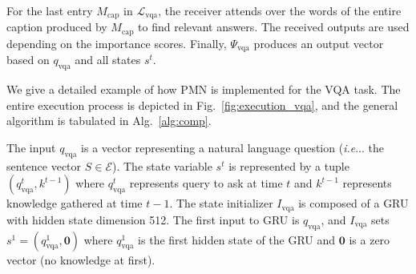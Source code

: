 \documentclass{article}
\makeatletter
\newcommand{\SK}[1]{{\color{NavyBlue}{[@Seung: #1]}}}
\def\E{\mathcal{E}}
\def\Mrel{M_\mathrm{rel}}
\def\Mcnt{M_\mathrm{cnt}}
\def\Mcap{M_\mathrm{cap}}
\def\Mvqa{M_\mathrm{vqa}}
\DeclareRobustCommand\onedot{\futurelet\@let@token\@onedot}
\def\@onedot{\ifx\@let@token.\else.\null\fi\xspace}
\def\ie{\emph{i.e}\onedot} \def\Ie{\emph{I.e}\onedot}
\makeatother
\begin{document}
For the last entry $\Mcap$ in $\mathcal L_\mathrm{vqa}$, the receiver attends over the words of the entire caption produced by $\Mcap$ to find relevant answers.
The received outputs are used depending on the importance scores.
Finally, $\Psi_\mathrm{vqa}$ produces an output vector based on $q_\mathrm{vqa}$ and all states $s^t$.

We give a detailed example of how PMN is implemented for the VQA task.
The entire execution process is depicted in Fig.~\ref{fig:execution_vqa}, and the general algorithm is tabulated in Alg.~\ref{alg:comp}.

The input $q_\mathrm{vqa}$ is a vector representing a natural language question (\ie. the sentence vector $S \in \E$).
The state variable $s^t$ is represented by a tuple $(q_{\mathrm{vqa}}^t, k^{t-1})$ where $q_{\mathrm{vqa}}^t$ represents query to ask at time $t$ and $k^{t-1}$ represents knowledge gathered at time $t-1$.
The state initializer $I_\mathrm{vqa}$ is composed of a GRU with hidden state dimension 512.
The first input to GRU is $q_\mathrm{vqa}$, and $I_\mathrm{vqa}$ sets $s^1 = (q_\mathrm{vqa}^1, \textbf{0})$ where $q_\mathrm{vqa}^1$ is the first hidden state of the GRU and $\textbf{0}$ is a zero vector (no knowledge at first).
\end{document}
